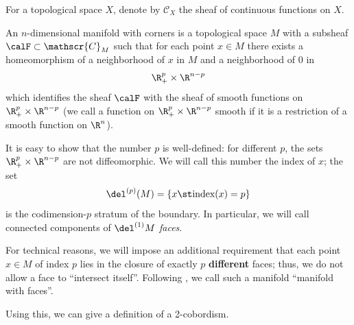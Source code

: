 For a topological space $X$, denote by $\mathscr{C}_X$ the sheaf of continuous
functions on $X$.%


\begin{definition}\label{d:manifold-corners}
  An $n$-dimensional manifold with corners is a topological space $M$ with a
  subsheaf $\calF\subset \mathscr{C}_M$ such that for each point $x\in M$ there
  exists a homeomorphism of a neighborhood of $x$ in $M$ and a neighborhood of
  $0$ in
  $$
    \R_+^p\times \R^{n-p}
  $$
  which identifies the sheaf $\calF$ with the sheaf of smooth functions
  on $\R_+^p\times \R^{n-p}$ (we call a function on $\R_+^p\times
  \R^{n-p}$ smooth if it is a restriction of a
  smooth function on $\R^n$).
\end{definition}
It is easy to show that the number $p$ is well-defined: for different $p$,
the sets $\R_+^p\times \R^{n-p}$ are not diffeomorphic. We will call this
number the index of $x$; the set
$$
  \del^{(p)}(M)=\{x\st \text{index}(x)=p\}
$$
is the codimension-$p$ stratum of the boundary. In particular, we will call
connected components of $\del^{(1)}M$ \emph{faces}.

For technical reasons, we will impose an additional requirement that each point
$x\in M$ of index $p$ lies in the closure of exactly $p$ \textbf{different} faces;
thus,
we do not allow a face to ``intersect itself''. Following
\cite{schommer-pries}, we call such a manifold ``manifold with faces''.

Using this, we can give a definition of a 2-cobordism.

